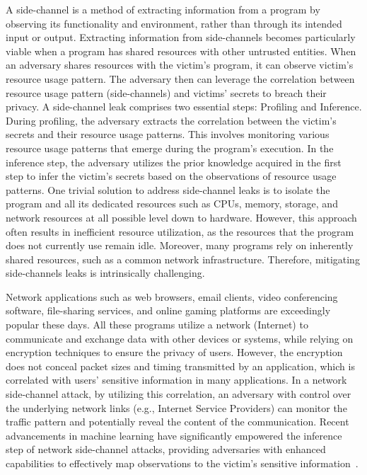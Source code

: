 A side-channel is a method of extracting information from a program by observing its functionality and environment, rather than through its intended input or output. 
Extracting information from side-channels becomes particularly viable when a program has shared resources with other untrusted entities. 
When an adversary shares resources with the victim's program, it can observe victim's resource usage pattern.
The adversary then can leverage the correlation between resource usage pattern (side-channels) and victims' secrets to breach their privacy. 
A side-channel leak comprises two essential steps: Profiling and Inference.
During profiling, the adversary extracts the correlation between the victim's secrets and their resource usage patterns.
This involves monitoring various resource usage patterns that emerge during the program's execution.
In the inference step, the adversary utilizes the prior knowledge acquired in the first step to infer the victim's secrets based on the observations of resource usage patterns.
One trivial solution to address side-channel leaks is to isolate the program and all its dedicated resources such as CPUs, memory, storage, and network resources at all possible level down to hardware. 
However, this approach often results in inefficient resource utilization, as the resources that the program does not currently use remain idle. 
Moreover, many programs rely on inherently shared resources, such as a common network infrastructure.
Therefore, mitigating side-channels leaks is intrinsically challenging. 

Network applications such as web browsers, email clients, video conferencing software, file-sharing services, and online gaming platforms are exceedingly popular these days.
All these programs utilize a network (\eg Internet) to communicate and exchange data with other devices or systems, while relying on encryption techniques to ensure the privacy of users.
However, the encryption does not conceal packet sizes and timing transmitted by an application, which is correlated with users' sensitive information in many applications.
In a network side-channel attack, by utilizing this correlation, an adversary with control over the underlying network links (e.g., Internet Service Providers) can monitor the traffic pattern and potentially reveal the content of the communication.
Recent advancements in machine learning have significantly empowered the inference step of network side-channel attacks, providing adversaries with enhanced capabilities to effectively map observations to the victim's sensitive information~\cite{schuster2017beautyburst, bhat2019varcnn, hayes2016kfp, sirinam2018df}.

